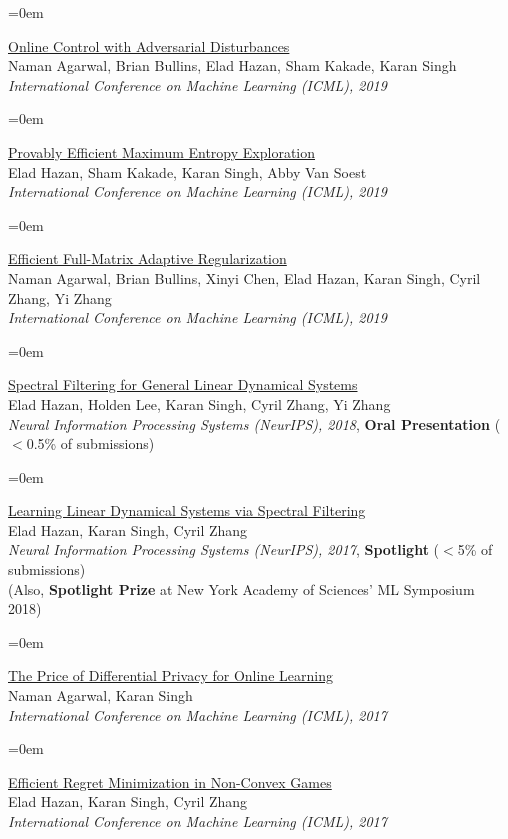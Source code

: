 \documentclass{scrartcl}
\newcommand{\Description}[1]{\hangindent=0em\hangafter=0\noindent\raggedright {#1}\par\normalsize\vspace{1em}}
\begin{document}
\begin{cv}{}
\Description{\href{http://proceedings.mlr.press/v97/agarwal19c/agarwal19c.pdf}{Online Control with Adversarial Disturbances} \\Naman Agarwal, Brian Bullins, Elad Hazan, Sham Kakade, Karan Singh\\ \textit{International Conference on Machine Learning (ICML), 2019}}


\Description{\href{http://proceedings.mlr.press/v97/hazan19a/hazan19a.pdf}{Provably Efficient Maximum Entropy Exploration}\\ Elad Hazan, Sham Kakade, Karan Singh, Abby Van Soest \\ \textit{International Conference on Machine Learning (ICML), 2019}}

\Description{\href{http://proceedings.mlr.press/v97/agarwal19b/agarwal19b.pdf}{Efficient Full-Matrix Adaptive Regularization} \\ Naman Agarwal, Brian Bullins, Xinyi Chen, Elad Hazan, Karan Singh, Cyril Zhang, Yi Zhang \\ \textit{International Conference on Machine Learning (ICML), 2019}}

\Description{\href{https://papers.nips.cc/paper/7714-spectral-filtering-for-general-linear-dynamical-systems.pdf}{Spectral Filtering for General Linear Dynamical Systems} \\Elad Hazan, Holden Lee, Karan Singh, Cyril Zhang, Yi Zhang\\ \textit{Neural Information Processing Systems (NeurIPS), 2018}, \textbf{Oral Presentation} ($<$0.5\% of submissions)}

\Description{\href{https://papers.nips.cc/paper/7247-learning-linear-dynamical-systems-via-spectral-filtering.pdf}{Learning Linear Dynamical Systems via Spectral Filtering}\\ Elad Hazan, Karan Singh, Cyril Zhang\\ \textit{Neural Information Processing Systems (NeurIPS), 2017}, \textbf{Spotlight} ($<$5\% of submissions)\\ (Also, \textbf{Spotlight Prize} at New York Academy of Sciences' ML Symposium 2018)}
\newpage

\Description{\href{http://proceedings.mlr.press/v70/agarwal17a/agarwal17a.pdf}{The Price of Differential Privacy for Online Learning}  \\ Naman Agarwal, Karan Singh \\ \textit{International Conference on Machine Learning (ICML), 2017}}


\Description{\href{http://proceedings.mlr.press/v70/hazan17a/hazan17a.pdf}{Efficient Regret Minimization in Non-Convex Games}\\ Elad Hazan, Karan Singh, Cyril Zhang  \\ \textit{International Conference on Machine Learning (ICML), 2017}}


\end{cv}
\end{document}

